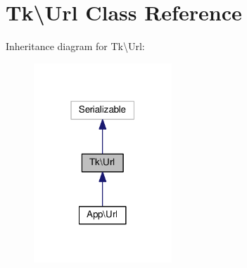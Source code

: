 \hypertarget{classTk_1_1Url}{\section{Tk\textbackslash{}Url Class Reference}
\label{classTk_1_1Url}
}


Inheritance diagram for Tk\textbackslash{}Url\+:\nopagebreak
\begin{figure}[H]
\begin{center}
\leavevmode
\includegraphics[width=147pt]{classTk_1_1Url__inherit__graph}
\end{center}
\end{figure}
